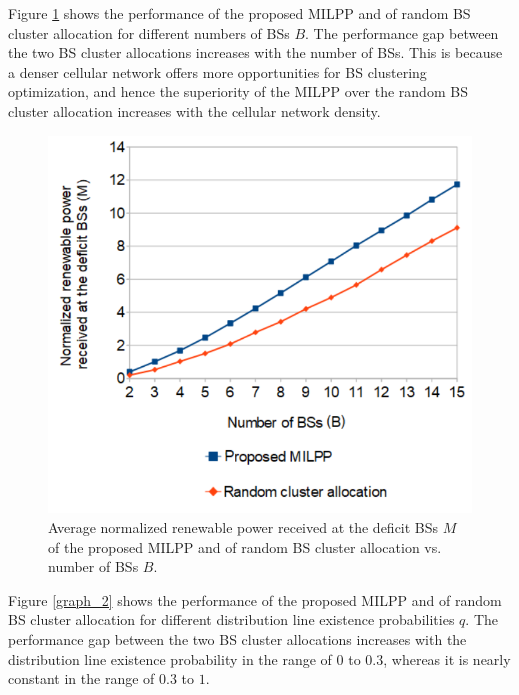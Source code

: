 Figure \ref{graph_1} shows the performance of the proposed MILPP and of random BS cluster allocation for different numbers of BSs $B$. The performance gap between the two BS cluster allocations increases with the number of BSs. This is because a denser cellular network offers more opportunities for BS clustering optimization, and hence the superiority of the MILPP over the random BS cluster allocation increases with the cellular network density.

\begin{figure}[H]
\centering
\includegraphics[width=0.75\columnwidth]{pictures/graph_1}
\caption{Average normalized renewable power received at the deficit BSs $M$ of the proposed MILPP and of random BS cluster allocation vs. number of BSs $B$. \label{graph_1}}
\end{figure}





Figure \ref{graph_2} shows the performance of the proposed MILPP and of random BS cluster allocation for different distribution line existence probabilities $q$. 
The performance gap between the two BS cluster allocations increases with the distribution line existence probability in the range of $0$ to $0.3$, whereas it is nearly constant in the range of $0.3$ to $1$. 

